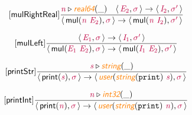 \documentclass[10pt,leqno,fleqn]{article}
\newcommand{\artVariable}[1]{\mbox{\color{purple}\em #1\/}}
\newcommand{\artConstructor}[1]{\mbox{\sf #1}}
\newcommand{\artCaseInsensitiveLiteral}[1]{\mbox{\tt #1}}
\newcommand{\artSpecial}[1]{\mbox{\color{orange}\sf\em #1}}
\begin{document}
\begin{equation}
\tag*{[\artConstructor{\sf mulRightReal}]}
\begin{split}\frac{ \artVariable{n}\triangleright \artSpecial{real64}(\_) \quad \langle\, \artVariable{E$_{2}$}, \artVariable{$\sigma$}\,\rangle \rightarrow \langle\, \artVariable{I$_{2}$}, \artVariable{$\sigma$\/$^\prime$}\,\rangle }{\langle\, \artConstructor{\sf mul}(\artVariable{n}\ \artVariable{E$_{2}$}), \artVariable{$\sigma$}\,\rangle \rightarrow \langle\, \artConstructor{\sf mul}(\artVariable{n}\ \artVariable{I$_{2}$}), \artVariable{$\sigma$\/$^\prime$}\,\rangle }
\end{split}
\end{equation}

\begin{equation}
\tag*{[\artConstructor{\sf mulLeft}]}
\begin{split}\frac{\langle\, \artVariable{E$_{1}$}, \artVariable{$\sigma$}\,\rangle \rightarrow \langle\, \artVariable{I$_{1}$}, \artVariable{$\sigma$\/$^\prime$}\,\rangle }{\langle\, \artConstructor{\sf mul}(\artVariable{E$_{1}$}\ \artVariable{E$_{2}$}), \artVariable{$\sigma$}\,\rangle \rightarrow \langle\, \artConstructor{\sf mul}(\artVariable{I$_{1}$}\ \artVariable{E$_{2}$}), \artVariable{$\sigma$\/$^\prime$}\,\rangle }
\end{split}
\end{equation}

\begin{equation}
\tag*{[\artConstructor{\sf printStr}]}
\begin{split}\frac{ \artVariable{s}\triangleright \artSpecial{string}(\_) }{\langle\, \artConstructor{\sf print}(\artVariable{s}), \artVariable{$\sigma$}\,\rangle \rightarrow \langle\, \artSpecial{user}(\artSpecial{string}(\artCaseInsensitiveLiteral{print})\ \artVariable{s}), \artVariable{$\sigma$}\,\rangle }
\end{split}
\end{equation}

\begin{equation}
\tag*{[\artConstructor{\sf printInt}]}
\begin{split}\frac{ \artVariable{n}\triangleright \artSpecial{int32}(\_) }{\langle\, \artConstructor{\sf print}(\artVariable{n}), \artVariable{$\sigma$}\,\rangle \rightarrow \langle\, \artSpecial{user}(\artSpecial{string}(\artCaseInsensitiveLiteral{print})\ \artVariable{n}), \artVariable{$\sigma$}\,\rangle }
\end{split}
\end{equation}
\end{document}
